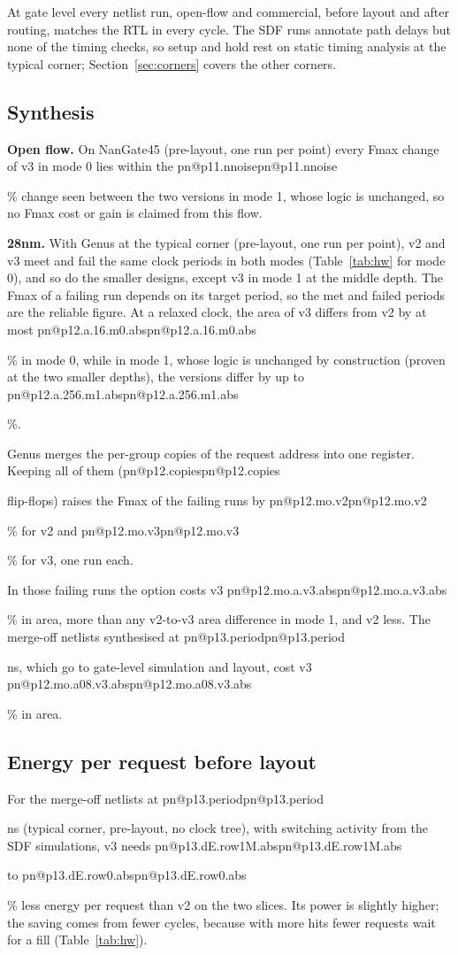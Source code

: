 \documentclass[conference,10pt]{IEEEtran}
\makeatletter
\newcommand{\R}[1]{\ifcsname pn@#1\endcsname\csname pn@#1\endcsname\else
  \PackageError{paper}{number key '#1' is not defined in macros.tex}{Run tools/make_paper_macros.py}\fi}
\makeatother
\begin{document}
At gate level every netlist run, open-flow and commercial, before layout and after routing, matches the RTL in every
cycle. The SDF runs annotate path delays but none of the timing checks, so setup and hold rest on static timing
analysis at the typical corner; Section~\ref{sec:corners} covers the other corners.

\subsection{Synthesis}
\textbf{Open flow.} On NanGate45 (pre-layout, one run per point) every Fmax change of v3 in mode 0 lies within the
\R{p11.nnoise}\% change seen between the two versions in mode 1, whose logic is unchanged, so no Fmax cost or gain
is claimed from this flow.

\textbf{28nm.} With Genus at the typical corner (pre-layout, one run per point), v2 and v3 meet and fail the same
clock periods in both modes (Table~\ref{tab:hw} for mode 0), and so do the smaller designs, except v3 in mode 1 at the middle
depth. The Fmax of a failing run depends on its target period, so the met and failed periods are the reliable figure.
At a relaxed clock, the area of v3 differs from v2 by at most \R{p12.a.16.m0.abs}\% in mode 0, while in mode 1, whose logic is
unchanged by construction (proven at the two smaller depths), the versions differ by up to \R{p12.a.256.m1.abs}\%.

Genus merges the per-group copies of the request address into one register. Keeping all of them (\R{p12.copies}
flip-flops) raises the Fmax of the failing runs by \R{p12.mo.v2}\% for v2 and \R{p12.mo.v3}\% for v3, one run each.

In those failing runs the option costs v3 \R{p12.mo.a.v3.abs}\% in area, more than any v2-to-v3 area difference in
mode 1, and v2 less. The merge-off netlists synthesised at \R{p13.period} ns, which go to gate-level simulation and
layout, cost v3 \R{p12.mo.a08.v3.abs}\% in area.

\subsection{Energy per request before layout}
For the merge-off netlists at \R{p13.period} ns (typical corner, pre-layout, no clock tree), with switching activity
from the SDF simulations, v3 needs \R{p13.dE.row1M.abs} to \R{p13.dE.row0.abs}\% less energy per request than v2 on
the two slices. Its power is slightly higher; the saving comes from fewer cycles, because with more hits fewer
requests wait for a fill (Table~\ref{tab:hw}).
\end{document}
